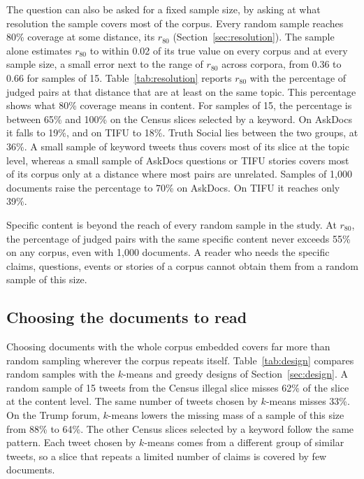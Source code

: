 The question can also be asked for a fixed sample size, by asking at what resolution the sample covers most of the corpus. Every random sample reaches 80\% coverage at some distance, its $r_{80}$ (Section~\ref{sec:resolution}). The sample alone estimates $r_{80}$ to within 0.02 of its true value on every corpus and at every sample size, a small error next to the range of $r_{80}$ across corpora, from 0.36 to 0.66 for samples of 15. Table~\ref{tab:resolution} reports $r_{80}$ with the percentage of judged pairs at that distance that are at least on the same topic. This percentage shows what 80\% coverage means in content. For samples of 15, the percentage is between 65\% and 100\% on the Census slices selected by a keyword. On AskDocs it falls to 19\%, and on TIFU to 18\%. Truth Social lies between the two groups, at 36\%. A small sample of keyword tweets thus covers most of its slice at the topic level, whereas a small sample of AskDocs questions or TIFU stories covers most of its corpus only at a distance where most pairs are unrelated. Samples of 1{,}000 documents raise the percentage to 70\% on AskDocs. On TIFU it reaches only 39\%.



Specific content is beyond the reach of every random sample in the study. At $r_{80}$, the percentage of judged pairs with the same specific content never exceeds 55\% on any corpus, even with 1{,}000 documents. A reader who needs the specific claims, questions, events or stories of a corpus cannot obtain them from a random sample of this size.

\subsection{Choosing the documents to read}
\label{sec:design-results}

Choosing documents with the whole corpus embedded covers far more than random sampling wherever the corpus repeats itself. Table~\ref{tab:design} compares random samples with the $k$-means and greedy designs of Section~\ref{sec:design}. A random sample of 15 tweets from the Census illegal slice misses 62\% of the slice at the content level. The same number of tweets chosen by $k$-means misses 33\%. On the Trump forum, $k$-means lowers the missing mass of a sample of this size from 88\% to 64\%. The other Census slices selected by a keyword follow the same pattern. Each tweet chosen by $k$-means comes from a different group of similar tweets, so a slice that repeats a limited number of claims is covered by few documents.

